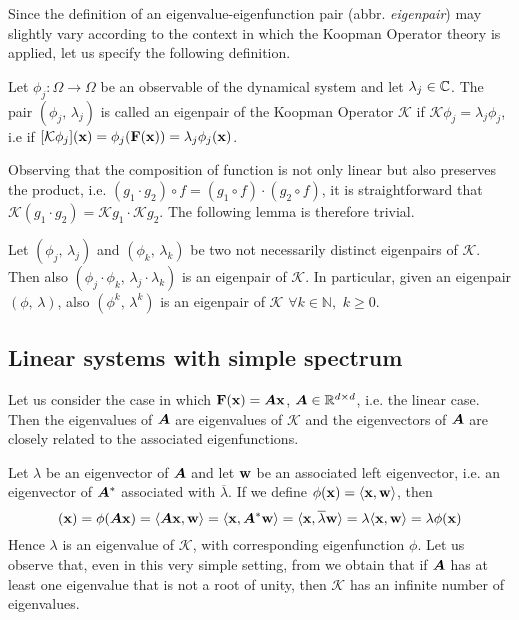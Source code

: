 Since the definition of an eigenvalue-eigenfunction pair (abbr. \emph{eigenpair}) may slightly vary according to the context in which the Koopman Operator theory is applied, let us specify the following definition.
\begin{definition}
Let $\phi_j:\Omega\to\Omega$ be an observable of the dynamical system and let $\lambda_j\in\mathbb{C}$. The pair $(\phi_j, \,\lambda_j)$ is called an eigenpair of the Koopman Operator $\mathcal{K}$ if $\mathcal{K}\phi_j = \lambda_j\phi_j$, i.e if $[\mathcal{K}\phi_j](\vb{x}) = \phi_j(\vb{F}(\vb{x})) = \lambda_j\phi_j(\vb{x})$.
\end{definition}

Observing that the composition of function is not only linear but also preserves the product, i.e. $(g_1 \cdot g_2) \circ f = (g_1 \circ f) \cdot (g_2 \circ f)$, it is straightforward that $\mathcal{K}(g_1\cdot g_2) = \mathcal{K}g_1\cdot \mathcal{K}g_2$. The following lemma is therefore trivial.
\begin{lemma}
\label{eigenpair_multiplication}
Let $(\phi_j, \,\lambda_j)$ and $(\phi_k, \,\lambda_k)$ be two not necessarily distinct eigenpairs of $\mathcal{K}$. Then also $(\phi_j\cdot\phi_k, \,\lambda_j\cdot\lambda_k)$ is an eigenpair of $\mathcal{K}$. In particular, given an eigenpair $(\phi, \,\lambda)$, also $(\phi^k, \,\lambda^k)$ is an eigenpair of $\mathcal{K}$ $\forall k\in\mathbb{N},\,\, k \geq 0$.
\end{lemma}

\subsection{Linear systems with simple spectrum}
Let us consider the case in which $\vb{F}(\vb{x}) = \vb*{A}\vb{x}$, $\vb*{A}\in\mathbb{R}^{d\times d}$, i.e. the linear case. Then the eigenvalues of $\vb*{A}$ are eigenvalues of $\mathcal{K}$ and the eigenvectors of $\vb*{A}$ are closely related to the associated eigenfunctions.

Let $\lambda$ be an eigenvector of $\vb*{A}$ and let $\vb{w}$ be an associated left eigenvector, i.e. an eigenvector of $\vb*{A}^*$ associated with $\overline{\lambda}$. If we define $\phi(\vb{x}) = \langle \vb{x},\vb{w} \rangle$, then
\begin{equation*}
    [\mathcal{K}\phi](\vb{x}) = \phi(\vb*{A}\vb{x}) = \langle \vb*{A}\vb{x},\vb{w} \rangle = \langle \vb{x}, \vb*{A}^*\vb{w} \rangle = \langle \vb{x}, \overline{\lambda}\vb{w} \rangle = \lambda \langle \vb{x},\vb{w} \rangle = \lambda \phi(\vb{x})
\end{equation*}
Hence $\lambda$ is an eigenvalue of $\mathcal{K}$, with corresponding eigenfunction $\phi$. Let us observe that, even in this very simple setting, from  we obtain that if $\vb*{A}$ has at least one eigenvalue that is not a root of unity, then $\mathcal{K}$ has an infinite number of eigenvalues.

